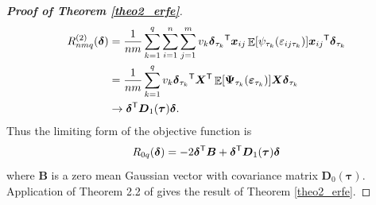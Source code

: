 \documentclass[15pt,a4paper]{article}
\DeclareMathOperator{\E}{\mathbb{E}}
\newcommand{\transpose}{{}^{\text{\sffamily T}}}
\begin{document}
\begin{proof}[\textbf{Proof of Theorem \ref{theo2_erfe}}]
\begin{align*}
\begin{split}
   R_{nmq}^{(2)}(\boldsymbol{\delta})&= \frac{1}{nm}\sum_{k=1}^{q}\sum_{i=1}^{n}\sum_{j=1}^{m}v_k\boldsymbol{\delta}_{\tau_k}\transpose\boldsymbol{x}_{ij}\E[\psi_{\tau_k}
   (\varepsilon_{ij{\tau_k}})]
        \boldsymbol{x}_{ij}\transpose\boldsymbol{\delta}_{\tau_k}\\
    &=\frac{1}{nm}\sum_{k=1}^{q}v_k \boldsymbol{\delta}_{\tau_k}\transpose\boldsymbol{X}\transpose\E[\boldsymbol{\Psi}_{\tau_k}(\boldsymbol{\varepsilon}_{\tau_k})]\boldsymbol{X}\boldsymbol{\delta}_{\tau_k}\\
    & \rightarrow\boldsymbol{\delta}\transpose\boldsymbol{D}_1(\boldsymbol{\tau})\boldsymbol{\delta}.
\end{split}
\end{align*}
Thus the limiting form of the objective function is
\begin{equation*}
    R_{0q}(\boldsymbol{\delta})=-2\boldsymbol{\delta}\transpose\boldsymbol{B}+\boldsymbol{\delta}\transpose \boldsymbol{D}_1(\boldsymbol{\tau}) \boldsymbol{\delta}
\end{equation*}
where $\boldsymbol{B}$ is a zero mean Gaussian vector with covariance matrix $\boldsymbol{D}_0(\boldsymbol{\tau}).$ Application of Theorem 2.2 of \citet{hjort_asymptotics_2011} gives the result of Theorem \ref{theo2_erfe}.
\end{proof}
\end{document}
